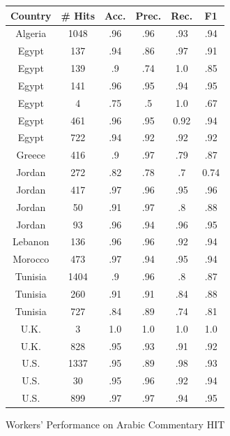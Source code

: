 \documentclass[10pt, a4paper]{article}
\begin{document}
\begin{figure}
\centering
\begin{tabular}{|c|c|c|c|c|c|} \hline 
Country & \# Hits  & Acc. 	& Prec. & Rec. & F1\\ \hline
Algeria & 1048 & .96 & .96 & .93 & .94 \\ \hline
Egypt & 137 & .94 & .86 & .97 & .91 \\ \hline
Egypt & 139 & .9 & .74 & 1.0 & .85 \\ \hline
Egypt & 141 & .96 & .95 & .94 & .95 \\ \hline
Egypt & 4 & .75 & .5 & 1.0 & .67 \\ \hline
Egypt & 461 & .96 & .95 & 0.92 & .94 \\ \hline
Egypt & 722 & .94 & .92 & .92 & .92 \\ \hline
Greece & 416 & .9 & .97 & .79 & .87 \\ \hline
Jordan & 272 & .82 & .78 & .7 & 0.74 \\ \hline
Jordan & 417 & .97 & .96 & .95 & .96 \\ \hline
Jordan & 50 & .91 & .97 & .8 & .88 \\ \hline
Jordan & 93 & .96 & .94 & .96 & .95 \\ \hline
Lebanon & 136 & .96 & .96 & .92 & .94 \\ \hline
Morocco & 473 & .97 & .94 & .95 & .94 \\ \hline
Tunisia & 1404 & .9 & .96 & .8 & .87 \\ \hline
Tunisia & 260 & .91 & .91 & .84 & .88 \\ \hline
Tunisia & 727 & .84 & .89 & .74 & .81 \\ \hline
U.K. & 3 & 1.0 & 1.0 & 1.0 & 1.0 \\ \hline
U.K. & 828 & .95 & .93 & .91 & .92 \\ \hline
U.S. & 1337 & .95 & .89 & .98 & .93 \\ \hline
U.S. & 30 & .95 & .96 & .92 & .94 \\ \hline
U.S. & 899 & .97 & .97 & .94 & .95 \\ \hline
\end{tabular}
\caption{Workers' Performance on Arabic Commentary HIT}
\label{fig:performance2}
\end{figure}


\end{document}
